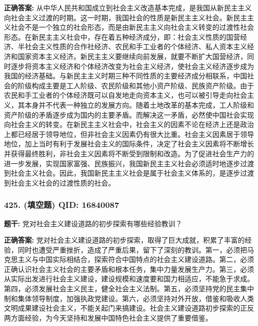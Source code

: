 \documentclass[12pt,UTF8]{ctexart}
\begin{document}
\textbf{正确答案:}
从中华人民共和国成立到社会主义改造基本完成，是我国从新民主主义向社会主义过渡的时期。这一时期，我国社会的性质是新民主主义社会。新民主主义社会不是一个独立的社会形态，而是由新民主主义向社会主义转变的过渡性社会形态。在新民主主义社会中，存在着五种经济成分，即：社会主义性质的国营经济、半社会主义性质的合作社经济、农民和手工业者的个体经济、私人资本主义经济和国家资本主义经济。新民主主义要继续向前发展，就要不断扩大国营经济，同时逐步将资本主义经济和个体经济改变为社会主义经济，使社会主义经济逐步成为我国的经济基础。与新民主主义时期三种不同性质的主要经济成分相联系，中国社会的阶级构成主要是工人阶级、农民阶级和其他小资产阶级、民族资产阶级。由于农民和手工业者的个体经济既可以自发地走向资本主义，也可以被引导走向社会主义，其本身并不代表一种独立的发展方向。随着土地改革的基本完成，工人阶级和资产阶级的矛盾逐步成为国内的主要矛盾。而解决这一矛盾，必然使中国社会实现向社会主义的转变。在新民主主义社会中，社会主义的因素不论在经济上还是政治上都已经居于领导地位，但非社会主义因素仍有很大比重。社会主义因素居于领导地位，加上当时有利于发展社会主义的国际条件，决定了社会主义因素将不断增长并获得最终胜利，非社会主义因素将不断受到限制和改造。为了促进社会生产力的进一步发展，实现国家富强、民族振兴，我国新民主主义社会必须适时地逐步过渡到社会主义社会。因此，我国新民主主义社会是属于社会主义体系的，是逐步过渡到社会主义社会的过渡性质的社会。

\vspace{0.3em}\hrulefill\vspace{0.7em}

\subsubsection*{425. (填空题) \small QID: 16840087}

\textbf{题干:}
党对社会主义建设道路的初步探索有哪些经验教训？

\textbf{正确答案:}
党对社会主义建设道路的初步探索，取得了巨大成就，积累了丰富的经验，同时也遭受严重挫折，造成了严重后果，留下了深刻的教训。第一，必须把马克思主义与中国实际相结合，探索符合中国特点的社会主义建设道路。第二，必须正确认识社会主义社会的主要矛盾和根本任务，集中力量发展生产力。第三，必须从实际出发进行社会主义建设，建设规模和速度要和国力相适应，不能急于求成。第四，必须发展社会主义民主，健全社会主义法制。第五，必须坚持党的民主集中制和集体领导制度，加强执政党建设。第六，必须坚持对外开放，借鉴和吸收人类文明成果建设社会主义，不能关起门来搞建设。社会主义建设道路初步探索的正反两方面经验，为今天坚持和发展中国特色社会主义提供了重要借鉴。

\vspace{0.3em}\hrulefill\vspace{0.7em}
\end{document}
